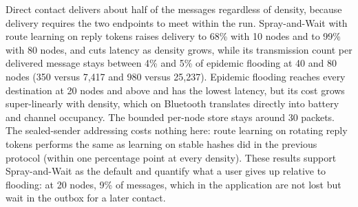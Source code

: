 \documentclass[conference]{IEEEtran}
\begin{document}
Direct contact delivers about half of the messages regardless of density, because delivery requires the two endpoints to meet within the run. Spray-and-Wait with route learning on reply tokens raises delivery to 68\% with 10 nodes and to 99\% with 80 nodes, and cuts latency as density grows, while its transmission count per delivered message stays between 4\% and 5\% of epidemic flooding at 40 and 80 nodes (350 versus 7,417 and 980 versus 25,237). Epidemic flooding reaches every destination at 20 nodes and above and has the lowest latency, but its cost grows super-linearly with density, which on Bluetooth translates directly into battery and channel occupancy. The bounded per-node store stays around 30 packets. The sealed-sender addressing costs nothing here: route learning on rotating reply tokens performs the same as learning on stable hashes did in the previous protocol (within one percentage point at every density). These results support Spray-and-Wait as the default and quantify what a user gives up relative to flooding: at 20 nodes, 9\% of messages, which in the application are not lost but wait in the outbox for a later contact.
\end{document}
